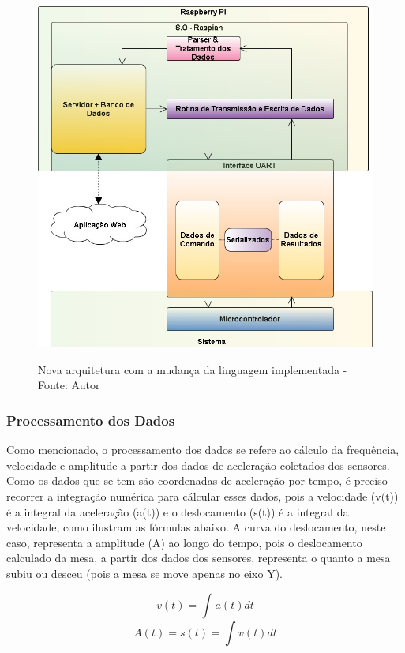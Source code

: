 \begin{figure}[H]
\centering
\includegraphics[keepaspectratio=true,scale=0.7]{figuras/nova_arquitetura.png}
\label{fig:nova_arquitetura}
\caption{Nova arquitetura com a mudança da linguagem implementada - Fonte: Autor}
\end{figure}

\subsubsection*{\textbf{Processamento dos Dados}} \label{software:processamento}

Como mencionado, o processamento dos dados se refere ao cálculo da frequência, velocidade e amplitude a partir dos dados de aceleração
coletados dos sensores. Como os dados que se tem são coordenadas de aceleração por tempo, é preciso recorrer a integração numérica para 
cálcular esses dados, pois a velocidade (v(t)) é a integral da aceleração (a(t)) e o deslocamento (s(t)) é a integral da velocidade, como 
ilustram as fórmulas abaixo. A curva do deslocamento, neste caso, representa a amplitude (A) ao longo do tempo, pois o deslocamento calculado
da mesa, a partir dos dados dos sensores, representa o quanto a mesa subiu ou desceu (pois a mesa se move apenas no eixo Y).

$$ v(t) = \int_{}^{} a(t) dt$$
$$ A(t) = s(t) = \int_{}^{} v(t) dt$$

